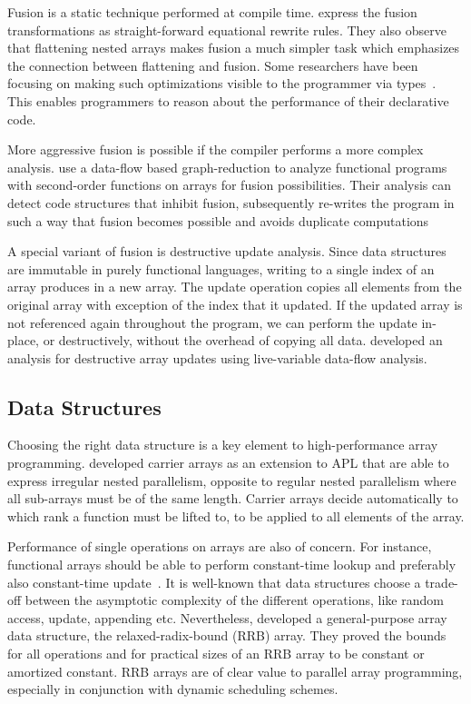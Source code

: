 \documentclass[a4paper]{article}
\begin{document}
Fusion is a static technique performed at compile time. \citet{Chakravarty:2001:FAF:507635.507661} express the fusion transformations as straight-forward equational rewrite rules. They also observe that flattening nested arrays makes fusion a much simpler task which emphasizes the connection between flattening and fusion. Some researchers have been focusing on making such optimizations visible to the programmer via types~\cite{Lippmeier:2012:GPA:2364506.2364511}. This enables programmers to reason about the performance of their declarative code.

More aggressive fusion is possible if the compiler performs a more complex analysis. \citet{Henriksen:2013:TGA:2502323.2502328} use a data-flow based graph-reduction to analyze functional programs with second-order functions on arrays for fusion possibilities. Their analysis can detect code structures that inhibit fusion, subsequently re-writes the program in such a way that fusion becomes possible and avoids duplicate computations

A special variant of fusion is destructive update analysis. Since data structures are immutable in purely functional languages, writing to a single index of an array produces in a new array. The update operation copies all elements from the original array with exception of the index that it updated. If the updated array is not referenced again throughout the program, we can perform the update in-place, or destructively, without the overhead of copying all data. \citet{Sastry:1994:PDU:182409.182486} developed an analysis for destructive array updates using live-variable data-flow analysis.

\subsection{Data Structures}
\label{sec:data-structures}

Choosing the right data structure is a key element to high-performance array programming. \citet{Lowney:1981:CAI:567532.567533} developed carrier arrays as an extension to APL that are able to express irregular nested parallelism, opposite to regular nested parallelism where all sub-arrays must be of the same length. Carrier arrays decide automatically to which rank a function must be lifted to, to be applied to all elements of the array.

Performance of single operations on arrays are also of concern. For instance, functional arrays should be able to perform constant-time lookup and preferably also constant-time update~\cite{47507}. It is well-known that data structures choose a trade-off between the asymptotic complexity of the different operations, like random access, update, appending etc. Nevertheless, \citet{Stucki:2015:RVP:2784731.2784739} developed a general-purpose array data structure, the relaxed-radix-bound (RRB) array. They proved the bounds for all operations and for practical sizes of an RRB array to be constant or amortized constant. RRB arrays are of clear value to parallel array programming, especially in conjunction with dynamic scheduling schemes.
\end{document}
